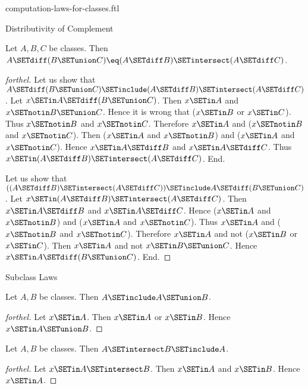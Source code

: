 \documentclass{naproche-library}
\begin{document}
\begin{smodule}[title=Computation Laws For Classes]{computation-laws-for-classes.ftl}
\begin{sfragment}{Distributivity of Complement}
  \begin{proposition}[forthel,id=FOUNDATIONS_02_2909554153095168]
    Let $A, B, C$ be classes.
    Then $A \SETdiff (B \SETunion C) \eq (A \SETdiff B) \SETintersect (A \SETdiff C)$.
  \end{proposition}
  \begin{proof}[forthel]
    Let us show that $A \SETdiff (B \SETunion C) \SETinclude (A \SETdiff B) \SETintersect (A \SETdiff C)$.
      Let $x \SETin A \SETdiff (B \SETunion C)$.
      Then $x \SETin A$ and $x \SETnotin B \SETunion C$.
      Hence it is wrong that ($x \SETin B$ or $x \SETin C$).
      Thus $x \SETnotin B$ and $x \SETnotin C$.
      Therefore $x \SETin A$ and ($x \SETnotin B$ and $x \SETnotin C$).
      Then ($x \SETin A$ and $x \SETnotin B$) and ($x \SETin A$ and $x \SETnotin C$).
      Hence $x \SETin A \SETdiff B$ and $x \SETin A \SETdiff C$.
      Thus $x \SETin (A \SETdiff B) \SETintersect (A \SETdiff C)$.
    End.

    Let us show that $((A \SETdiff B) \SETintersect (A \SETdiff C)) \SETinclude A \SETdiff (B \SETunion C)$. %
      Let $x \SETin (A \SETdiff B) \SETintersect (A \SETdiff C)$.
      Then $x \SETin A \SETdiff B$ and $x \SETin A \SETdiff C$.
      Hence ($x \SETin A$ and $x \SETnotin B$) and ($x \SETin A$ and $x \SETnotin C$).
      Thus $x \SETin A$ and ($x \SETnotin B$ and $x \SETnotin C$).
      Therefore $x \SETin A$ and not ($x \SETin B$ or $x \SETin C$).
      Then $x \SETin A$ and not $x \SETin B \SETunion C$.
      Hence $x \SETin A \SETdiff (B \SETunion C)$.
    End.
  \end{proof}
\end{sfragment}

\begin{sfragment}{Subclass Laws}
  \begin{proposition}[forthel,id=FOUNDATIONS_02_3793981508943872]
    Let $A, B$ be classes.
    Then $A \SETinclude A \SETunion B$.
  \end{proposition}
  \begin{proof}[forthel]
    Let $x \SETin A$.
    Then $x \SETin A$ or $x \SETin B$.
    Hence $x \SETin A \SETunion B$.
  \end{proof}

  \begin{proposition}[forthel,id=FOUNDATIONS_02_1591517646946304]
    Let $A, B$ be classes.
    Then $A \SETintersect B \SETinclude A$.
  \end{proposition}
  \begin{proof}[forthel]
    Let $x \SETin A \SETintersect B$.
    Then $x \SETin A$ and $x \SETin B$.
    Hence $x \SETin A$.
  \end{proof}


\end{sfragment}
\end{smodule}
\end{document}
